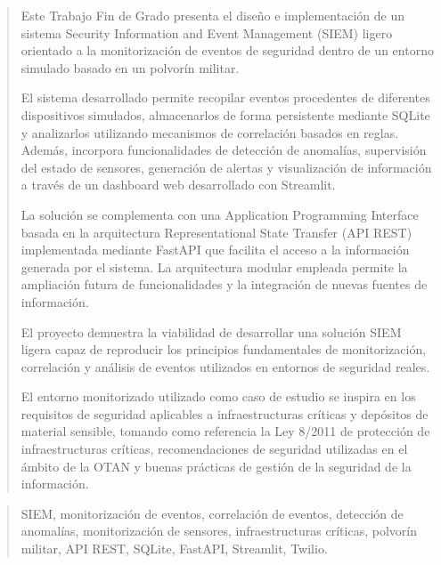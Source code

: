 \documentclass[a4paper,12pt,twoside]{memoir}
\begin{document}
\frontmatter

\renewcommand*\abstractname{Resumen}
\begin{abstract}
Este Trabajo Fin de Grado presenta el diseño e implementación de un sistema Security Information and Event Management (SIEM) ligero orientado a la monitorización de eventos de seguridad dentro de un entorno simulado basado en un polvorín militar.

El sistema desarrollado permite recopilar eventos procedentes de diferentes dispositivos simulados, almacenarlos de forma persistente mediante SQLite y analizarlos utilizando mecanismos de correlación basados en reglas. Además, incorpora funcionalidades de detección de anomalías, supervisión del estado de sensores, generación de alertas y visualización de información a través de un dashboard web desarrollado con Streamlit.

La solución se complementa con una Application Programming Interface basada en la arquitectura Representational State Transfer (API REST)  implementada mediante FastAPI que facilita el acceso a la información generada por el sistema. La arquitectura modular empleada permite la ampliación futura de funcionalidades y la integración de nuevas fuentes de información.

El proyecto demuestra la viabilidad de desarrollar una solución SIEM ligera capaz de reproducir los principios fundamentales de monitorización, correlación y análisis de eventos utilizados en entornos de seguridad reales.

El entorno monitorizado utilizado como caso de estudio se inspira en los requisitos de seguridad aplicables a infraestructuras críticas y depósitos de material sensible, tomando como referencia la Ley 8/2011 de protección de infraestructuras críticas, recomendaciones de seguridad utilizadas en el ámbito de la OTAN y buenas prácticas de gestión de la seguridad de la información.

\end{abstract}

\renewcommand*\abstractname{Descriptores}
\begin{abstract}
SIEM, monitorización de eventos, correlación de eventos, detección de anomalías, monitorización de sensores, infraestructuras críticas, polvorín militar, API REST, SQLite, FastAPI, Streamlit, Twilio.
\end{abstract}

\clearpage
\end{document}
